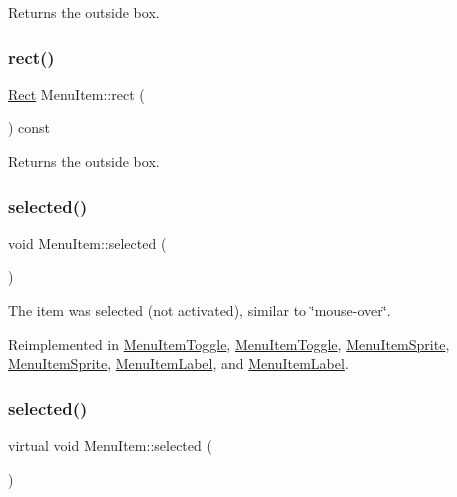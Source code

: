 Returns the outside box. \mbox{\label{classMenuItem_a3d6b05193856cc8d5e5e2a2d98736e4c}} 
\subsubsection{\texorpdfstring{rect()}{rect()}\hspace{0.1cm}{\footnotesize\ttfamily [2/2]}}
{\footnotesize\ttfamily \hyperlink{classRect}{Rect} Menu\+Item\+::rect (\begin{DoxyParamCaption}{ }\end{DoxyParamCaption}) const}

Returns the outside box. \mbox{\label{classMenuItem_aa0330b2c1e2066eb7eee87ade6e6740f}} 
\subsubsection{\texorpdfstring{selected()}{selected()}\hspace{0.1cm}{\footnotesize\ttfamily [1/2]}}
{\footnotesize\ttfamily void Menu\+Item\+::selected (\begin{DoxyParamCaption}{ }\end{DoxyParamCaption})\hspace{0.3cm}{\ttfamily [virtual]}}

The item was selected (not activated), similar to \char`\"{}mouse-\/over\char`\"{}. 

Reimplemented in \hyperlink{classMenuItemToggle_ad10d606528c3625314bf75e5db442bf4}{Menu\+Item\+Toggle}, \hyperlink{classMenuItemToggle_ab9a7783e4ba3ed0d8636ea77424f7aab}{Menu\+Item\+Toggle}, \hyperlink{classMenuItemSprite_ab48a29704c139512abfb0835fecfa087}{Menu\+Item\+Sprite}, \hyperlink{classMenuItemSprite_a668b5d916cb926e161cc7ebdf96364e6}{Menu\+Item\+Sprite}, \hyperlink{classMenuItemLabel_a7c274195091bece411d64330754ea2e2}{Menu\+Item\+Label}, and \hyperlink{classMenuItemLabel_aabdccb0d37847efa1a0ba0f717dcee30}{Menu\+Item\+Label}.

\mbox{\label{classMenuItem_a4ae00eee33600b702f1019643d6b0ccf}} 
\subsubsection{\texorpdfstring{selected()}{selected()}\hspace{0.1cm}{\footnotesize\ttfamily [2/2]}}
{\footnotesize\ttfamily virtual void Menu\+Item\+::selected (\begin{DoxyParamCaption}{ }\end{DoxyParamCaption})\hspace{0.3cm}{\ttfamily [virtual]}}

